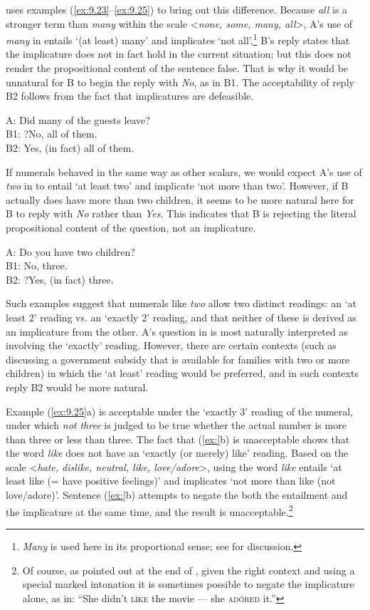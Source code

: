\citet{Horn2004} uses examples (\ref{ex:9.23}--\ref{ex:9.25}) to bring out this difference. Because \textit{all} is a stronger term than \textit{many} within the scale <\textit{none, some, many, all}>, A’s use of \textit{many} in  entails ‘(at least) many’ and implicates ‘not all’.\footnote{\textit{Many} is used here in its proportional sense; see  for discussion.} B’s reply states that the implicature does not in fact hold in the current situation; but this does not render the propositional content of the sentence false. That is why it would be unnatural for B to begin the reply with \textit{No}, as in B1. The acceptability of reply B2 follows from the fact that implicatures are defeasible.


\ea \label{ex:9.23}
A: Did many of the guests leave?\\
B1: ?No, all of them.\\
B2: Yes, (in fact) all of them.
\z


If numerals behaved in the same way as other scalars, we would expect A’s use of \textit{two} in  to entail ‘at least two’ and implicate ‘not more than two’. However, if B actually does have more than two children, it seems to be more natural here for B to reply with \textit{No} rather than \textit{Yes}. This indicates that B is rejecting the literal propositional content of the question, not an implicature.


\ea \label{ex:9.24}
A: Do you have two children?\\
B1: No, three.\\
B2: ?Yes, (in fact) three.
\z


Such examples suggest that numerals like \textit{two} allow two distinct readings: an ‘at least 2’ reading vs. an ‘exactly 2’ reading, and that neither of these is derived as an implicature from the other. A’s question in  is most naturally interpreted as involving the ‘exactly’ reading. However, there are certain contexts (such as discussing a government subsidy that is available for families with two or more children) in which the ‘at least’ reading would be preferred, and in such contexts reply B2 would be more natural.



Example (\ref{ex:9.25}a) is acceptable under the ‘exactly 3’ reading of the numeral, under which \textit{not three} is judged to be true whether the actual number is more than three or less than three. The fact that (\ref{ex:}b) is unacceptable shows that the word \textit{like} does not have an ‘exactly (or merely) like’ reading. Based on the scale <\textit{hate, dislike, neutral, like, love/adore}>, using the word \textit{like} entails ‘at least like (= have positive feelings)’ and implicates ‘not more than like (not love/adore)’. Sentence (\ref{ex:}b) attempts to negate the both the entailment and the implicature at the same time, and the result is unacceptable.\footnote{Of course, as pointed out at the end of , given the right context and using a special marked intonation it is sometimes possible to negate the implicature alone, as in: “She didn’t \textsc{líke} the movie — she \textsc{adóred} it.”}


